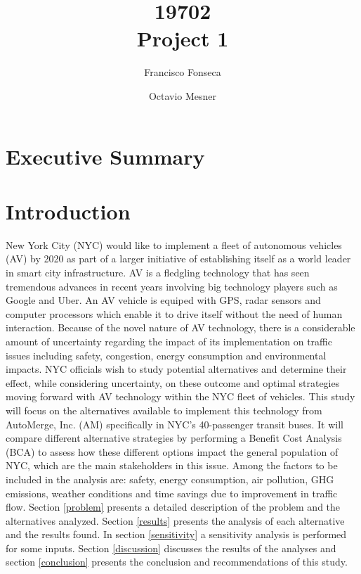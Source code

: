 \documentclass[11pt, letterpaper]{article}
\title{\vspace{-2cm} 19702 \\ Project 1}
\author{Francisco Fonseca \and Octavio Mesner}
\date{\mydate}
\date{\mydateformat\normalsize\mydate} %
\begin{document}

\section*{Executive Summary} \label{execsum}

\pagebreak
\section{Introduction} \label{intro}

New York City (NYC) would like to implement a fleet of autonomous
vehicles (AV) by 2020 as part of a larger initiative of establishing
itself as a world leader in smart city infrastructure. AV is a fledgling technology
that has seen tremendous advances in recent years involving
big technology players such as Google and Uber. An AV vehicle is equiped with 
GPS, radar sensors and computer processors which enable it to drive itself without the 
need of human interaction. Because of the
novel nature of AV technology, there is a considerable amount of
uncertainty regarding the impact of its implementation on traffic
issues including safety, congestion, energy consumption and environmental impacts.
NYC officials wish to study potential alternatives and determine their effect, while
considering uncertainty, on these outcome
and optimal strategies moving forward with AV
technology within the NYC fleet of vehicles. This study will focus on
the alternatives available to implement  this technology
from AutoMerge, Inc. (AM) specifically in NYC's 40-passenger transit
buses. It will compare different alternative strategies by performing
a Benefit Cost Analysis (BCA) to assess how these different options
impact the general population of NYC, which are the main stakeholders
in this issue. Among the factors to be included in the analysis are:
safety, energy consumption, air pollution, GHG emissions, weather
conditions and time savings due to improvement in traffic flow. Section \ref{problem} 
presents a detailed description of the problem and the alternatives analyzed. Section
\ref{results} presents the analysis of each alternative and the
results found. In section \ref{sensitivity} a sensitivity analysis is
performed for some inputs. Section \ref{discussion} discusses the
results of the analyses and section \ref{conclusion} presents the
conclusion and recommendations of this study.
\end{document}
